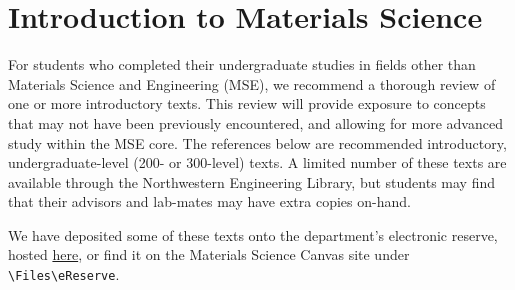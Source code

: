 \section{Introduction to Materials Science} \label{sec:Intro}

For students who completed their undergraduate studies in fields other than Materials Science and Engineering (MSE), we recommend a thorough review of one or more introductory texts. This review will provide exposure to concepts that may not have been previously encountered, and allowing for more advanced study within the MSE core. The references below are recommended introductory, undergraduate-level (200- or 300-level) texts. A limited number of these texts are available through the Northwestern Engineering Library, but students may find that their advisors and lab-mates may have extra copies on-hand.

We have deposited some of these texts onto the department's electronic reserve, hosted \href{https://northwestern.box.com/s/13myp0an8snmmfjqfbx9gt1gbfrah0aj}{here}, or find it on the Materials Science Canvas site under \verb=\Files\eReserve=.

